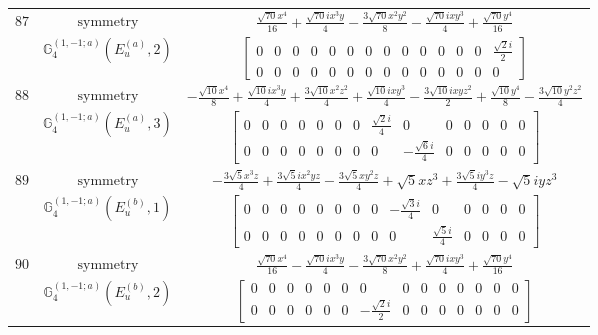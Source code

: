 \documentclass[fleqn,8pt,landscape]{jsarticle}
\begin{document}
\begin{longtable}{ccc}
$ 87 $ & $ \text{symmetry} $ & $ \frac{\sqrt{70} x^{4}}{16} + \frac{\sqrt{70} i x^{3} y}{4} - \frac{3 \sqrt{70} x^{2} y^{2}}{8} - \frac{\sqrt{70} i x y^{3}}{4} + \frac{\sqrt{70} y^{4}}{16} $ \\
$  $ & $ \mathbb{G}_{4}^{(1,-1;a)}(E_{u}^{(a)},2) $ & $ \begin{bmatrix} 0 & 0 & 0 & 0 & 0 & 0 & 0 & 0 & 0 & 0 & 0 & 0 & 0 & \frac{\sqrt{2} i}{2} \\ 0 & 0 & 0 & 0 & 0 & 0 & 0 & 0 & 0 & 0 & 0 & 0 & 0 & 0 \end{bmatrix} $ \\ \hline
$ 88 $ & $ \text{symmetry} $ & $ - \frac{\sqrt{10} x^{4}}{8} + \frac{\sqrt{10} i x^{3} y}{4} + \frac{3 \sqrt{10} x^{2} z^{2}}{4} + \frac{\sqrt{10} i x y^{3}}{4} - \frac{3 \sqrt{10} i x y z^{2}}{2} + \frac{\sqrt{10} y^{4}}{8} - \frac{3 \sqrt{10} y^{2} z^{2}}{4} $ \\
$  $ & $ \mathbb{G}_{4}^{(1,-1;a)}(E_{u}^{(a)},3) $ & $ \begin{bmatrix} 0 & 0 & 0 & 0 & 0 & 0 & 0 & \frac{\sqrt{2} i}{4} & 0 & 0 & 0 & 0 & 0 & 0 \\ 0 & 0 & 0 & 0 & 0 & 0 & 0 & 0 & - \frac{\sqrt{6} i}{4} & 0 & 0 & 0 & 0 & 0 \end{bmatrix} $ \\ \hline
$ 89 $ & $ \text{symmetry} $ & $ - \frac{3 \sqrt{5} x^{3} z}{4} + \frac{3 \sqrt{5} i x^{2} y z}{4} - \frac{3 \sqrt{5} x y^{2} z}{4} + \sqrt{5} x z^{3} + \frac{3 \sqrt{5} i y^{3} z}{4} - \sqrt{5} i y z^{3} $ \\
$  $ & $ \mathbb{G}_{4}^{(1,-1;a)}(E_{u}^{(b)},1) $ & $ \begin{bmatrix} 0 & 0 & 0 & 0 & 0 & 0 & 0 & 0 & - \frac{\sqrt{3} i}{4} & 0 & 0 & 0 & 0 & 0 \\ 0 & 0 & 0 & 0 & 0 & 0 & 0 & 0 & 0 & \frac{\sqrt{5} i}{4} & 0 & 0 & 0 & 0 \end{bmatrix} $ \\ \hline
$ 90 $ & $ \text{symmetry} $ & $ \frac{\sqrt{70} x^{4}}{16} - \frac{\sqrt{70} i x^{3} y}{4} - \frac{3 \sqrt{70} x^{2} y^{2}}{8} + \frac{\sqrt{70} i x y^{3}}{4} + \frac{\sqrt{70} y^{4}}{16} $ \\
$  $ & $ \mathbb{G}_{4}^{(1,-1;a)}(E_{u}^{(b)},2) $ & $ \begin{bmatrix} 0 & 0 & 0 & 0 & 0 & 0 & 0 & 0 & 0 & 0 & 0 & 0 & 0 & 0 \\ 0 & 0 & 0 & 0 & 0 & 0 & - \frac{\sqrt{2} i}{2} & 0 & 0 & 0 & 0 & 0 & 0 & 0 \end{bmatrix} $ \\ \hline

\end{longtable}
\end{document}
